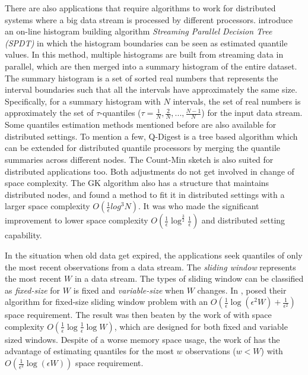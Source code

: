 There are also applications that require algorithms to work for distributed systems where a big data stream is processed by different processors.
\citeauthor{ben-haimStreamingParallelDecision2010}\cite{ben-haimStreamingParallelDecision2010} introduce an on-line histogram building algorithm \textit{Streaming Parallel Decision Tree (SPDT)} in which the histogram boundaries can be seen as estimated quantile values.
In this method, multiple histograms are built from streaming data in parallel, which are then merged into a summary histogram of the entire dataset. The summary histogram is a set of sorted real numbers that represents the interval boundaries such that all the intervals have approximately the same size. Specifically, for a summary histogram with $N$ intervals, the set of real numbers is approximately the set of $\tau$-quantiles ($\tau = \frac{1}{N}, \frac{2}{N}, ..., \frac{N-1}{N}$) for the input data stream.
Some quantiles estimation methods mentioned before are also available for distributed settings. To mention a few,
{Q-Digest}\cite{shrivastavaMediansNewAggregation2004b} is a tree based algorithm which can be extended for distributed quantile processors by merging the quantile summaries across different nodes. The Count-Min sketch\cite{cormodeImprovedDataStream2005} is also suited for distributed applications too. Both adjustments do not get involved in change of space complexity.
The {GK} algorithm also has a structure that maintains distributed nodes, and \citeauthor{greenwaldPowerconservingComputationOrderstatistics2004}\cite{greenwaldPowerconservingComputationOrderstatistics2004} found a method to fit it in distributed settings with a larger space complexity $O(\frac{1}{\epsilon}log^3 N)$.
It was \citeauthor{agarwalMergeableSummaries2013}\cite{agarwalMergeableSummaries2013} who made the significant improvement to lower space complexity 
$O(\frac{1}{\epsilon}\log^{\frac{3}{2}}\frac{1}{\epsilon})$
and distributed setting capability.

In the situation when old data get expired, the applications seek quantiles of only the most recent observations from a data stream.
The \textit{sliding window} represents the most recent $W$ in a data stream. The types of sliding window can be classified as \textit{fixed-size} for $W$ is fixed and \textit{variable-size} when $W$ changes.
In \cite{linContinuouslyMaintainingQuantile2004}, \citeauthor{linContinuouslyMaintainingQuantile2004} posed their algorithm for fixed-size sliding window problem with an 
$O(\frac{1}{\epsilon} \log (\epsilon^2 W) + \frac{1}{\epsilon^2})$ space requirement.
The result was then beaten by the work of \citeauthor{arasuApproximateCountsQuantiles2004}\cite{arasuApproximateCountsQuantiles2004} with space complexity 
$O(\frac{1}{\epsilon} \log\frac{1}{\epsilon} \log W)$,
which are designed for both fixed and variable sized windows.
Despite of a worse memory space usage, the work of \citeauthor{linContinuouslyMaintainingQuantile2004}\cite{linContinuouslyMaintainingQuantile2004} has the advantage of estimating quantiles for the most $w$ observations ($w < W$) with $O(\frac{1}{\epsilon^2} \log (\epsilon W))$ space requirement.


